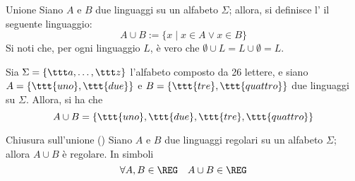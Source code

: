 \documentclass[a4paper, 12pt]{report}
\begin{document}
    \begin{frameddefn}{Unione}
        Siano $A$ e $B$ due linguaggi su un alfabeto $\Sigma$; allora, si definisce l' il seguente linguaggio: $$A \cup B := \{x \mid x \in A \lor x \in B \}$$ Si noti che, per ogni linguaggio $L$, è vero che $\emptyset \cup L = L \cup \emptyset = L$.
    \end{frameddefn}

    \begin{example}[Unione]
        Sia $\Sigma = \{\ttt a , \ldots, \ttt z\}$ l'alfabeto composto da 26 lettere, e siano $A = \{\ttt{uno}, \ttt{due}\}$ e $B = \{\ttt{tre}, \ttt{quattro}\}$ due linguaggi su $\Sigma$. Allora, si ha che $$A \cup B = \{\ttt{uno}, \ttt{due}, \ttt{tre}, \ttt{quattro}\}$$
    \end{example}

    \begin{framedprop}[label={closure unione}]{Chiusura sull'unione (\REG)}
        Siano $A$ e $B$ due linguaggi regolari su un alfabeto $\Sigma$; allora $A \cup B$ è regolare. In simboli $$\forall A, B \in \REG \quad A \cup B \in \REG$$
    \end{framedprop}
\end{document}
